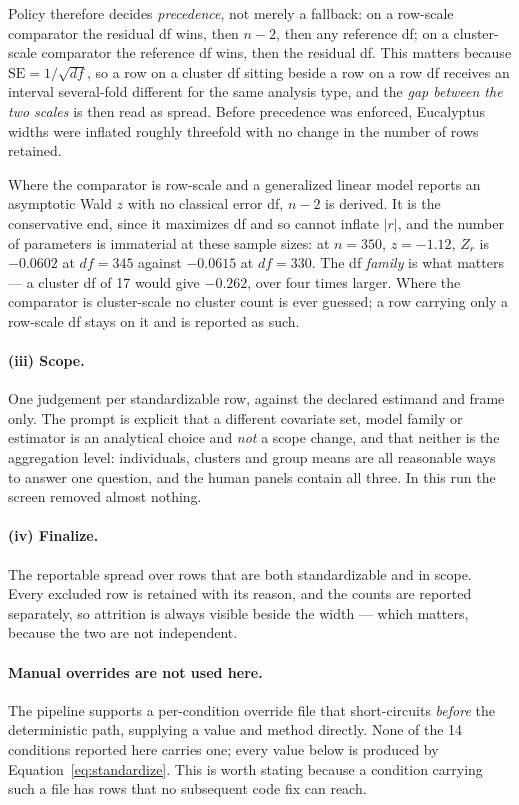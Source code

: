 \documentclass{article}
\begin{document}
Policy therefore decides \emph{precedence}, not merely a fallback: on a
row-scale comparator the residual df wins, then $n - 2$, then any reference df;
on a cluster-scale comparator the reference df wins, then the residual df. This
matters because $\mathrm{SE} = 1/\sqrt{\mathit{df}}$, so a row on a cluster df
sitting beside a row on a row df receives an interval several-fold different for
the same analysis type, and the \emph{gap between the two scales} is then read
as spread. Before precedence was enforced, Eucalyptus widths were inflated
roughly threefold with no change in the number of rows retained.

Where the comparator is row-scale and a generalized linear model reports an
asymptotic Wald $z$ with no classical error df, $n - 2$ is derived. It is the
conservative end, since it maximizes df and so cannot inflate $|r|$, and the
number of parameters is immaterial at these sample sizes: at $n = 350$,
$z = -1.12$, $Z_r$ is $-0.0602$ at $\mathit{df} = 345$ against $-0.0615$ at
$\mathit{df} = 330$. The df \emph{family} is what matters --- a cluster df of 17
would give $-0.262$, over four times larger. Where the comparator is
cluster-scale no cluster count is ever guessed; a row carrying only a row-scale
df stays on it and is reported as such.

\paragraph{(iii) Scope.}
One judgement per standardizable row, against the declared estimand and frame
only. The prompt is explicit that a different covariate set, model family or
estimator is an analytical choice and \emph{not} a scope change, and that
neither is the aggregation level: individuals, clusters and group means are all
reasonable ways to answer one question, and the human panels contain all three.
In this run the screen removed almost nothing.

\paragraph{(iv) Finalize.}
The reportable spread over rows that are both standardizable and in scope. Every
excluded row is retained with its reason, and the counts are reported
separately, so attrition is always visible beside the width --- which matters,
because the two are not independent.

\paragraph{Manual overrides are not used here.}
The pipeline supports a per-condition override file that short-circuits
\emph{before} the deterministic path, supplying a value and method directly.
None of the 14 conditions reported here carries one; every value below is
produced by Equation~\ref{eq:standardize}. This is worth stating because a
condition carrying such a file has rows that no subsequent code fix can reach.
\end{document}
